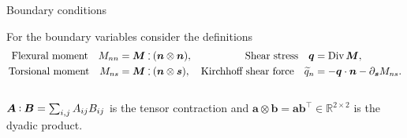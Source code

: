 \documentclass[aspectratio=169]{ISAE-Beamer}
\DeclareMathOperator*{\Div}{Div}
\def\onedot{$\mathsurround0pt\ldotp$}
\def\cddot{%
	\mathbin{\vcenter{\baselineskip.67ex
			\hbox{\onedot}\hbox{\onedot}}%
}}
\begin{document}
\begin{frame}{Boundary conditions}
\begin{overlayarea}{\textwidth}{\textheight}
For the boundary variables consider the definitions
\begin{equation*}
\begin{aligned}
\text{Flexural moment} \quad M_{nn} &= \bm{M} \cddot (\bm{n}\otimes\bm{n}), \\
\text{Torsional moment} \quad M_{ns} &= \bm{M} \cddot (\bm{n}\otimes\bm{s}),
\end{aligned} \quad
\begin{aligned}
\text{Shear stress} \quad \bm{q} &= \Div \bm{M}, \\
\text{Kirchhoff shear force} \quad \widetilde{q}_n &= - \bm{q}\cdot \bm{n} - \partial_{\bm{s}} M_{ns}.
\end{aligned}
\end{equation*} \\
$\bm{A} \cddot \bm{B} = \sum_{i, j} A_{ij} B_{ij}$ is the tensor contraction and $\bm{a} \otimes \bm{b} = \bm{a} \bm{b}^\top \in \mathbb{R}^{2\times 2}$ is the dyadic product. \\
\begin{tcolorbox}
	\centering

\end{tcolorbox}
\end{overlayarea}
\end{frame}
\end{document}
